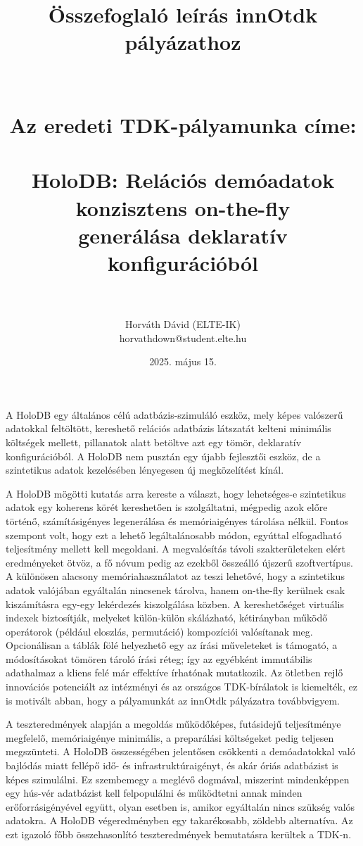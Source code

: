 \documentclass[12pt]{article}
\title{Összefoglaló leírás innOtdk pályázathoz \\ ~ \\ ~ \\ {\Large Az eredeti TDK-pályamunka címe: \\ ~ \\ HoloDB: Relációs demóadatok konzisztens on-the-fly \\ generálása deklaratív konfigurációból} \\ ~}
\author{Horváth Dávid (ELTE-IK) \\ horvathdown@student.elte.hu}
\date{2025. május 15.}
\begin{document}
\begin{titlepage}
\maketitle
\thispagestyle{empty}
\end{titlepage}

\cleardoublepage

A HoloDB egy általános célú adatbázis-szimuláló eszköz, mely képes valószerű adatokkal feltöltött, kereshető relációs adatbázis látszatát kelteni
minimális költségek mellett, pillanatok alatt betöltve azt egy tömör, deklaratív konfigurációból.
A HoloDB nem pusztán egy újabb fejlesztői eszköz, de a szintetikus adatok kezelésében lényegesen új megközelítést kínál.

A HoloDB mögötti kutatás arra kereste a választ, hogy lehetséges-e szintetikus adatok egy koherens körét kereshetően is szolgáltatni, mégpedig azok előre történő, számításigényes legenerálása és memóriaigényes tárolása nélkül.
Fontos szempont volt, hogy ezt a lehető legáltalánosabb módon, egyúttal elfogadható teljesítmény mellett kell megoldani.
A megvalósítás távoli szakterületeken elért eredményeket ötvöz, a fő nóvum pedig az ezekből összeálló újszerű szoftvertípus.
A különösen alacsony memóriahasználatot az teszi lehetővé, hogy a szintetikus adatok valójában egyáltalán nincsenek tárolva, hanem on-the-fly kerülnek csak kiszámításra egy-egy lekérdezés kiszolgálása közben.
A kereshetőséget virtuális indexek biztosítják, melyeket külön-külön skálázható, kétirányban működő operátorok (például eloszlás, permutáció) kompozíciói valósítanak meg.
Opcionálisan a táblák fölé helyezhető egy az írási műveleteket is támogató, a módosításokat tömören tároló írási réteg;
így az egyébként immutábilis adathalmaz a kliens felé már effektíve írhatónak mutatkozik.
Az ötletben rejlő innovációs potenciált az intézményi és az országos TDK-bírálatok is kiemelték, ez is motivált abban, hogy a pályamunkát az innOtdk pályázatra továbbvigyem.

A teszteredmények alapján a megoldás működőképes, futásidejű teljesítménye megfelelő, memóriaigénye minimális, a preparálási költségeket pedig teljesen megszünteti.
A HoloDB összességében jelentősen csökkenti a demóadatokkal való bajlódás miatt fellépő idő- és infrastruktúraigényt, és akár óriás adatbázist is képes szimulálni.
Ez szembemegy a meglévő dogmával, miszerint mindenképpen egy hús-vér adatbázist kell felpopulálni és működtetni annak minden erőforrásigényével együtt, olyan esetben is, amikor egyáltalán nincs szükség valós adatokra.
A HoloDB végeredményben egy takarékosabb, zöldebb alternatíva.
Az ezt igazoló főbb összehasonlító teszteredmények bemutatásra kerültek a TDK-n.
\end{document}
